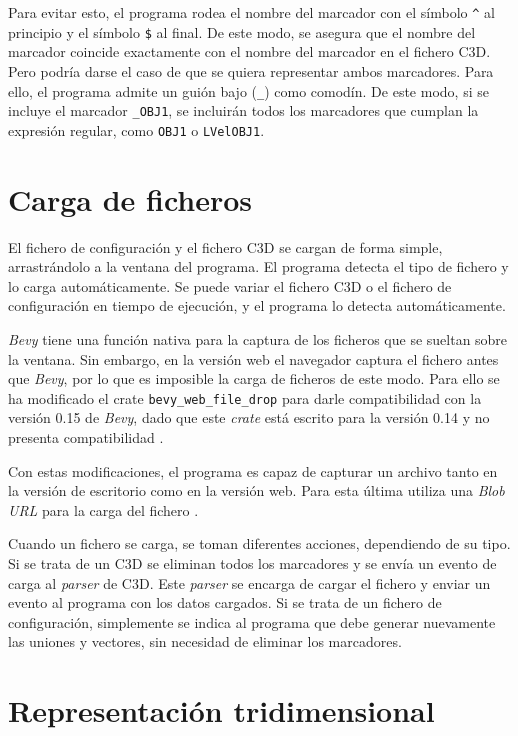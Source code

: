 Para evitar esto, el programa rodea el nombre del marcador con el símbolo \texttt{\^} al principio y el símbolo \texttt{\$} al final. De este modo, se asegura que el nombre del marcador coincide exactamente con el nombre del marcador en el fichero \ac{C3D}. Pero podría darse el caso de que se quiera representar ambos marcadores. Para ello, el programa admite un guión bajo (\texttt{\_}) como comodín. De este modo, si se incluye el marcador \texttt{\_OBJ1}, se incluirán todos los marcadores que cumplan la expresión regular, como \texttt{OBJ1} o \texttt{LVelOBJ1}. 

\section{Carga de ficheros}

El fichero de configuración y el fichero \ac{C3D} se cargan de forma simple, arrastrándolo a la ventana del programa. El programa detecta el tipo de fichero y lo carga automáticamente. Se puede variar el fichero \ac{C3D} o el fichero de configuración en tiempo de ejecución, y el programa lo detecta automáticamente.

\textit{Bevy} tiene una función nativa para la captura de los ficheros que se sueltan sobre la ventana. Sin embargo, en la versión web el navegador captura el fichero antes que \textit{Bevy}, por lo que es imposible la carga de ficheros de este modo. Para ello se ha modificado el crate \texttt{bevy\_web\_file\_drop} para darle compatibilidad con la versión 0.15 de \textit{Bevy}, dado que este \textit{crate} está escrito para la versión 0.14 y no presenta compatibilidad \autocite{Bevy_web_file_dropCratesioRust2024}.

Con estas modificaciones, el programa es capaz de capturar un archivo tanto en la versión de escritorio como en la versión web. Para esta última utiliza una \textit{Blob URL} para la carga del fichero \autocite{AnswerWhatBlob2015,FileAPI}.

Cuando un fichero se carga, se toman diferentes acciones, dependiendo de su tipo. Si se trata de un \ac{C3D} se eliminan todos los marcadores y se envía un evento de carga al \textit{parser} de \ac{C3D}. Este \textit{parser} se encarga de cargar el fichero y enviar un evento al programa con los datos cargados. Si se trata de un fichero de configuración, simplemente se indica al programa que debe generar nuevamente las uniones y vectores, sin necesidad de eliminar los marcadores. 

\section{Representación tridimensional} \label{sec:representacion-3d}

